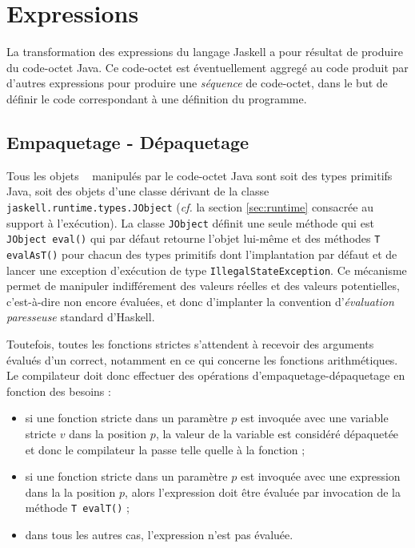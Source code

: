 \section{Expressions}

La transformation des expressions du langage Jaskell a pour r\'esultat
de produire du code-octet Java. Ce code-octet est \'eventuellement
aggreg\'e au code produit par d'autres expressions pour produire une
\emph{s\'equence} de code-octet, dans le but de d\'efinir le code
correspondant \`a une d\'efinition du programme. 

\subsection{Empaquetage - D\'epaquetage}

Tous les \og objets \fg~ manipul\'es par le code-octet Java sont soit
des types primitifs Java, soit des objets d'une classe d\'erivant de la
classe \texttt{jaskell.runtime.types.JObject} (\emph{cf.} la section
\ref{sec:runtime} consacr\'ee au support \`a l'ex\'ecution). La classe
\texttt{JObject} d\'efinit une seule m\'ethode qui est \texttt{JObject
  eval()}  qui par d\'efaut retourne l'objet lui-m\^eme et des m\'ethodes 
\texttt{T evalAsT()} pour chacun des types primitifs dont
l'implantation par d\'efaut et de lancer une exception d'ex\'ecution de type
\texttt{IllegalStateException}. Ce m\'ecanisme permet de manipuler
indiff\'erement des valeurs r\'eelles et des valeurs potentielles,
c'est-\`a-dire non encore \'evalu\'ees, et donc d'implanter la convention
d'\emph{\'evaluation paresseuse} standard d'Haskell.

Toutefois, toutes les fonctions strictes s'attendent \`a recevoir des
arguments \'evalu\'es d'un correct, notamment en ce qui concerne les
fonctions arithm\'etiques. Le compilateur doit donc effectuer des
op\'erations d'empaquetage-d\'epaquetage en fonction des besoins :
\begin{itemize}
  \item si une fonction stricte dans un param\`etre $p$ est invoqu\'ee
    avec une variable stricte $v$ dans la position $p$, la valeur de
    la variable est consid\'er\'e d\'epaquet\'ee et donc le compilateur la
    passe telle quelle \`a la fonction ;
  \item si une fonction stricte dans un param\`etre $p$ est invoqu\'ee
    avec une expression dans la la position $p$, alors l'expression
    doit \^etre \'evalu\'ee par invocation de la m\'ethode \texttt{T evalT()}
    ;
  \item dans tous les autres cas, l'expression n'est pas \'evalu\'ee.
\end{itemize}

